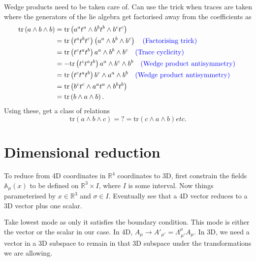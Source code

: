 \documentclass{article}
\begin{document}
\noindent Wedge products need to be taken care of. Can use the trick when traces are taken where the generators of the lie algebra get factorised away from the coefficients as 
\begin{align}
    \text{tr}\left(a\wedge b\wedge b \right)&= \text{tr}\left(a^{a}t^{a}\wedge b^{b}t^{b}\wedge b^{c}t^{c} \right)\nonumber \\
    &= \text{tr}\left(t^{a}t^{b}t^{c} \right)\left(a^{a}\wedge b^{b}\wedge b^{c} \right)\nonumber\quad \text{\color{blue}(Factorising trick) \color{black}}\\
    &= \text{tr}\left(t^{c}t^{a}t^{b} \right)a^{a}\wedge b^{b}\wedge b^{c} \nonumber\quad \text{\color{blue}(Trace cyclicity) \color{black}}\\
    &= -\text{tr}\left(t^{c}t^{a}t^{b} \right)a^{a}\wedge b^{c}\wedge b^{b} \nonumber\quad \text{\color{blue}(Wedge product antisymmetry) \color{black}}\\
    &= \text{tr}\left(t^{c}t^{a}t^{b} \right)b^{c}\wedge a^{a}\wedge b^{b} \nonumber\quad \text{\color{blue}(Wedge product antisymmetry) \color{black}}\\
    &=\text{tr}\left(b^{c}t^{c}\wedge a^{a}t^{a}\wedge b^{b}t^{b} \right)\nonumber \\
    &=  \text{tr}\left(b\wedge a\wedge b \right).
\end{align}
Using these, get a class of relations
\begin{equation}
    \text{tr}\left(a\wedge b\wedge c \right) =?= \text{tr}\left(c\wedge a \wedge b \right) etc. 
\end{equation}


\section{Dimensional reduction}
To reduce from 4D coordinates in $\mathbb{R}^{4}$ coordinates to 3D, first constrain the fields $\mathbb{A}_{\mu}(x)$ to be defined on $\mathbb{R}^{3}\times I$, where $I$ is some interval. Now things parameterised by $x\in \mathbb{R}^{3}$ and $\sigma\in I$. Eventually see that a 4D vector reduces to a 3D vector plus one scalar. \newline 

\noindent Take lowest mode as only it satisfies the boundary condition. This mode is either the vector or the scalar in our case. In 4D, $A_{\mu} \rightarrow A'_{\mu'} = \Lambda^{\mu}_{\,\mu '}A_{\mu}$. In 3D, we need a vector in a 3D subspace to remain in that 3D subspace under the transformations we are allowing. 
\end{document}
